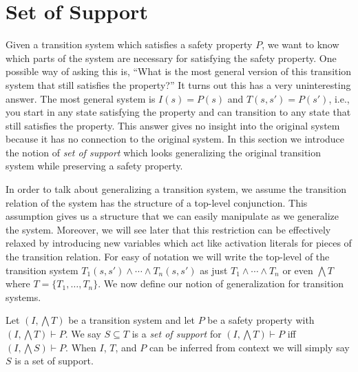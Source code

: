 \section{Set of Support}
\label{sec:support}


Given a transition system which satisfies a safety property $P$, we
want to know which parts of the system are necessary for satisfying
the safety property. One possible way of asking this is, ``What is the
most general version of this transition system that still satisfies
the property?'' It turns out this has a very uninteresting answer. The
most general system is $I(s) = P(s)$ and $T(s, s') = P(s')$, i.e., you
start in any state satisfying the property and can transition to any
state that still satisfies the property. This answer gives no insight
into the original system because it has no connection to the original
system. In this section we introduce the notion of {\em set of
  support} which looks generalizing the original transition system
while preserving a safety property.

In order to talk about generalizing a transition system, we assume the
transition relation of the system has the structure of a top-level
conjunction. This assumption gives us a structure that we can easily
manipulate as we generalize the system. Moreover, we will see later
that this restriction can be effectively relaxed by introducing new
variables which act like activation literals for pieces of the
transition relation. For easy of notation we will write the top-level
of the transition system $T_1(s, s') \land \cdots \land T_n(s, s')$ as
just $T_1 \land \cdots \land T_n$ or even $\bigwedge T$ where $T =
\{T_1, \ldots, T_n\}$. We now define our notion of generalization for
transition systems.


\begin{definition}
  \label{def:set-of-support}
  Let $(I, \bigwedge T)$ be a transition system and let $P$ be a
  safety property with $(I, \bigwedge T)\vdash P$. We say $S \subseteq
  T$ is a {\em set of support} for $(I, \bigwedge T)\vdash P$ iff $(I,
  \bigwedge S) \vdash P$. When $I$, $T$, and $P$ can be inferred from
  context we will simply say $S$ is a set of support.
\end{definition}

